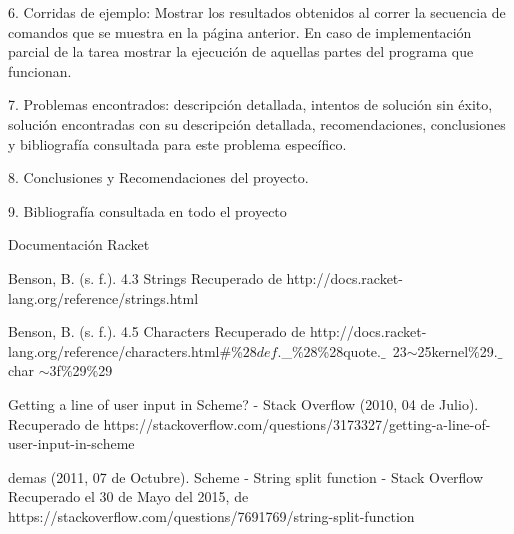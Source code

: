 \documentclass[12pt,a4paper]{report}
\begin{document}
\begin{flushleft}

6. Corridas de ejemplo: Mostrar los resultados obtenidos al correr la secuencia
de comandos que se muestra en la página anterior. En caso de
implementación parcial de la tarea mostrar la ejecución de aquellas partes
del programa que funcionan.

\end{flushleft}

\begin{flushleft}

7. Problemas encontrados: descripción detallada, intentos de solución sin éxito,
solución encontradas con su descripción detallada, recomendaciones,
conclusiones y bibliografía consultada para este problema específico.

\end{flushleft}

\begin{flushleft}

8. Conclusiones y Recomendaciones del proyecto.

\end{flushleft}

\begin{flushleft}

9. Bibliografía consultada en todo el proyecto




Documentación Racket

Benson, B. (s. f.). 4.3 Strings Recuperado de http://docs.racket-lang.org/reference/strings.html

Benson, B. (s. f.). 4.5 Characters Recuperado de http://docs.racket-lang.org/reference/characters.html$\#$\%$28def.$\_$\%28$\%28quote.$\_$~23$\sim$25kernel$\%$29.$\_$char
$\sim3$f$\%$29$\%$29

Getting a line of user input in Scheme? - Stack Overflow (2010, 04 de Julio). Recuperado de https://stackoverflow.com/questions/3173327/getting-a-line-of-user-input-in-scheme


demas (2011, 07 de Octubre). Scheme - String split function - Stack Overflow Recuperado el 30 de Mayo del 2015, de https://stackoverflow.com/questions/7691769/string-split-function











\end{flushleft}
\end{document}
